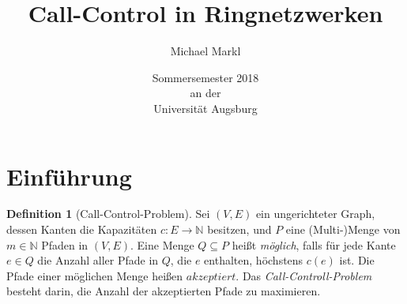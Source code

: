 \documentclass[11pt]{article}
\title{\bfseries Call-Control in Ringnetzwerken}
\author{Michael Markl}
\date{Sommersemester 2018\\ an der\\ Universität Augsburg}
\theoremstyle{definition}
\newtheorem{definition}{Definition}[section]
\begin{document}
    \maketitle
    \clearpage

    \tableofcontents
    \clearpage

    \setcounter{section}{0}

    \section{Einführung}\label{sec:einführung}

    \begin{definition}[Call-Control-Problem]
        Sei $(V,E)$ ein ungerichteter Graph, dessen Kanten die Kapazitäten $c: E \to \mathbb{N}$ besitzen, und $P$ eine
        (Multi-)Menge von $m \in \mathbb{N}$ Pfaden in $(V,E)$. Eine Menge $Q \subseteq P$ heißt {\em möglich}, falls
        für jede Kante $e \in Q$ die Anzahl aller Pfade in $Q$, die $e$ enthalten, höchstens $c(e)$ ist.
        Die Pfade einer möglichen Menge heißen $akzeptiert$. Das {\em Call-Controll-Problem} besteht darin, die Anzahl
        der akzeptierten Pfade zu maximieren.
    \end{definition}
\end{document}

